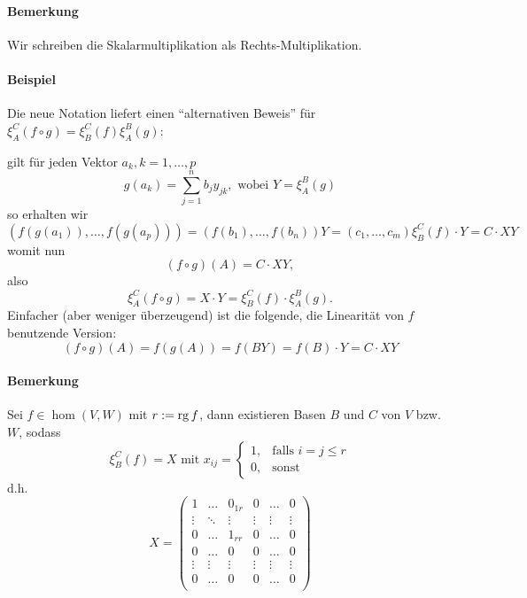 \paragraph{Bemerkung}
	Wir schreiben die Skalarmultiplikation als Rechts-Multiplikation.
\paragraph{Beispiel}
	Die neue Notation liefert einen "`alternativen Beweis"' für $ \xi_A^C(f\circ g) = \xi_B^C(f)\xi_A^B(g) $:
	
	gilt für jeden Vektor $ a_k,k=1,\dots,p $
		\[ g(a_k) = \sum_{j=1}^{n}b_jy_{jk}, \text{ wobei } Y = \xi_A^B(g) \]
	so erhalten wir
		\[ (f(g(a_1)),\dots, f(g(a_p))) = (f(b_1),\dots , f(b_n))Y = (c_1,\dots,c_m)\xi_B^C(f)\cdot Y = C\cdot XY \]
	womit nun
		\[ (f\circ g)(A) = C\cdot XY, \]
	also
		\[ \xi_A^C(f\circ g) = X\cdot Y = \xi_B^C(f)\cdot \xi_A^B(g). \]
	Einfacher (aber weniger überzeugend) ist die folgende, die Linearität von $ f $ benutzende Version:
		\[( f\circ g )(A) = f(g(A)) = f(BY) = f(B)\cdot Y = C\cdot XY\]
\paragraph{Bemerkung}
	Sei $ f\in \hom(V,W) $ mit $ r:= \operatorname{rg} f $, dann existieren Basen $ B $ und $ C $ von $ V $ bzw. $ W $, sodass
		\[ \xi_B^C(f) = X \text{ mit } x_{ij} =
			\begin{cases}
			1,& \text{falls }i=j\leq r\\
			0,& \text{sonst}
			\end{cases} \]
	d.h.
		\[ X = \left(\begin{array}{ccc|ccc}
		1      & \dots  & 0_{1r} & 0      &\dots &0 \\
		\vdots & \ddots & \vdots & \vdots &\vdots&\vdots\\
		0      & \dots  & 1_{rr} & 0      &\dots &0 \\\hline
		0      & \dots  & 0      & 0      &\dots &0 \\
		\vdots & \vdots & \vdots & \vdots &\vdots&\vdots \\
                0      & \dots  & 0      & 0      &\dots &0\\
		\end{array}\right) \]
		
